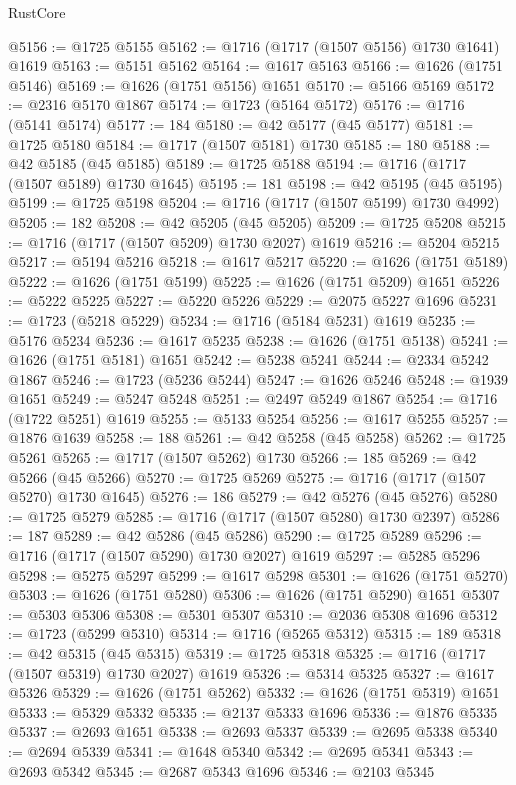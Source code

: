 \begin{lexlean}{RustCore}
\begin{coremodule}
@5156 := @1725 @5155
@5162 := @1716 (@1717 (@1507 @5156) @1730 @1641) @1619
@5163 := @5151 @5162
@5164 := @1617 @5163
@5166 := @1626 (@1751 @5146)
@5169 := @1626 (@1751 @5156) @1651
@5170 := @5166 @5169
@5172 := @2316 @5170 @1867
@5174 := @1723 (@5164 @5172)
@5176 := @1716 (@5141 @5174)
@5177 := 184
@5180 := @42 @5177 (@45 @5177)
@5181 := @1725 @5180
@5184 := @1717 (@1507 @5181) @1730
@5185 := 180
@5188 := @42 @5185 (@45 @5185)
@5189 := @1725 @5188
@5194 := @1716 (@1717 (@1507 @5189) @1730 @1645)
@5195 := 181
@5198 := @42 @5195 (@45 @5195)
@5199 := @1725 @5198
@5204 := @1716 (@1717 (@1507 @5199) @1730 @4992)
@5205 := 182
@5208 := @42 @5205 (@45 @5205)
@5209 := @1725 @5208
@5215 := @1716 (@1717 (@1507 @5209) @1730 @2027) @1619
@5216 := @5204 @5215
@5217 := @5194 @5216
@5218 := @1617 @5217
@5220 := @1626 (@1751 @5189)
@5222 := @1626 (@1751 @5199)
@5225 := @1626 (@1751 @5209) @1651
@5226 := @5222 @5225
@5227 := @5220 @5226
@5229 := @2075 @5227 @1696
@5231 := @1723 (@5218 @5229)
@5234 := @1716 (@5184 @5231) @1619
@5235 := @5176 @5234
@5236 := @1617 @5235
@5238 := @1626 (@1751 @5138)
@5241 := @1626 (@1751 @5181) @1651
@5242 := @5238 @5241
@5244 := @2334 @5242 @1867
@5246 := @1723 (@5236 @5244)
@5247 := @1626 @5246
@5248 := @1939 @1651
@5249 := @5247 @5248
@5251 := @2497 @5249 @1867
@5254 := @1716 (@1722 @5251) @1619
@5255 := @5133 @5254
@5256 := @1617 @5255
@5257 := @1876 @1639
@5258 := 188
@5261 := @42 @5258 (@45 @5258)
@5262 := @1725 @5261
@5265 := @1717 (@1507 @5262) @1730
@5266 := 185
@5269 := @42 @5266 (@45 @5266)
@5270 := @1725 @5269
@5275 := @1716 (@1717 (@1507 @5270) @1730 @1645)
@5276 := 186
@5279 := @42 @5276 (@45 @5276)
@5280 := @1725 @5279
@5285 := @1716 (@1717 (@1507 @5280) @1730 @2397)
@5286 := 187
@5289 := @42 @5286 (@45 @5286)
@5290 := @1725 @5289
@5296 := @1716 (@1717 (@1507 @5290) @1730 @2027) @1619
@5297 := @5285 @5296
@5298 := @5275 @5297
@5299 := @1617 @5298
@5301 := @1626 (@1751 @5270)
@5303 := @1626 (@1751 @5280)
@5306 := @1626 (@1751 @5290) @1651
@5307 := @5303 @5306
@5308 := @5301 @5307
@5310 := @2036 @5308 @1696
@5312 := @1723 (@5299 @5310)
@5314 := @1716 (@5265 @5312)
@5315 := 189
@5318 := @42 @5315 (@45 @5315)
@5319 := @1725 @5318
@5325 := @1716 (@1717 (@1507 @5319) @1730 @2027) @1619
@5326 := @5314 @5325
@5327 := @1617 @5326
@5329 := @1626 (@1751 @5262)
@5332 := @1626 (@1751 @5319) @1651
@5333 := @5329 @5332
@5335 := @2137 @5333 @1696
@5336 := @1876 @5335
@5337 := @2693 @1651
@5338 := @2693 @5337
@5339 := @2695 @5338
@5340 := @2694 @5339
@5341 := @1648 @5340
@5342 := @2695 @5341
@5343 := @2693 @5342
@5345 := @2687 @5343 @1696
@5346 := @2103 @5345

\end{coremodule}
\end{lexlean}
